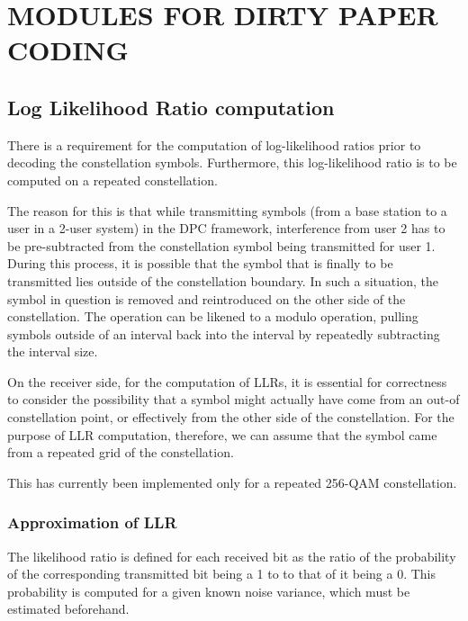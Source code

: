 \chapter{MODULES FOR DIRTY PAPER CODING}
\label{chap:dpc-modules}


\section{Log Likelihood Ratio computation}

There is a requirement for the computation of log-likelihood ratios prior to
decoding the constellation symbols. Furthermore, this log-likelihood ratio is
to be computed on a repeated constellation.

The reason for this is that while transmitting symbols (from a base station to
a user in a 2-user system) in the DPC framework, interference from user 2 has
to be pre-subtracted from the constellation symbol being transmitted for user
1. During this process, it is possible that the symbol that is finally to be
transmitted lies outside of the constellation boundary. In such a situation,
the symbol in question is removed and reintroduced on the other side of the
constellation. The operation can be likened to a modulo operation, pulling
symbols outside of an interval back into the interval by repeatedly subtracting
the interval size.

On the receiver side, for the computation of LLRs, it is essential for
correctness to consider the possibility that a symbol might actually have come
from an out-of constellation point, or effectively from the other side of the
constellation. For the purpose of LLR computation, therefore, we can assume
that the symbol came from a repeated grid of the constellation.

This has currently been implemented only for a repeated 256-QAM constellation.

\subsection{Approximation of LLR}

The likelihood ratio is defined for each received bit as the ratio of the
probability of the corresponding transmitted bit being a 1 to to that of it
being a 0. This probability is computed for a given known noise variance, which
must be estimated beforehand.

